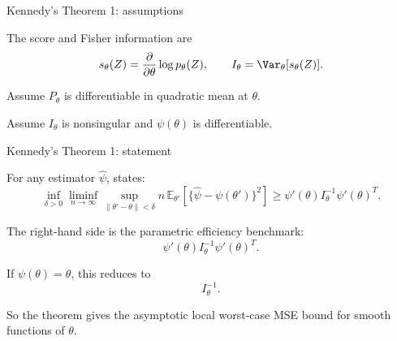\documentclass[xcolor={table}, handout]{beamer}
\begin{document}
\note{
\scriptsize \singlespacing

}
\begin{frame}{Kennedy's Theorem 1: assumptions}

\small

\begin{wideitemize}
\item The score and Fisher information are
\[
s_\theta(Z)
  =
  \frac{\partial}{\partial\theta}\log p_\theta(Z),
\qquad
I_\theta=\Var_\theta[s_\theta(Z)].
\]\pause
\item Assume $P_\theta$ is differentiable in quadratic mean at $\theta$.\pause
\item Assume $I_\theta$ is nonsingular and $\psi(\theta)$ is differentiable.
\end{wideitemize}

\end{frame}

\note{
\scriptsize \singlespacing

}
\begin{frame}{Kennedy's Theorem 1: statement}

\small

\begin{wideitemize}
\item For any estimator $\hat\psi$, \citet{kennedy2022semiparametric} states:
\[
\inf_{\delta>0}
\liminf_{n\rightarrow\infty}
\sup_{\|\theta'-\theta\|<\delta}
n\,
\mathbb{E}_{\theta'}
\left[
  \{\hat\psi-\psi(\theta')\}^2
\right]
\geq
\psi'(\theta) I_\theta^{-1} \psi'(\theta)^T.
\]\pause
\item The right-hand side is the parametric efficiency benchmark:
\[
\psi'(\theta) I_\theta^{-1} \psi'(\theta)^T.
\]\pause
\item If $\psi(\theta)=\theta$, this reduces to
\[
I_\theta^{-1}.
\]\pause
\item So the theorem gives the asymptotic local worst-case MSE bound for smooth functions of $\theta$.
\end{wideitemize}

\end{frame}
\end{document}
